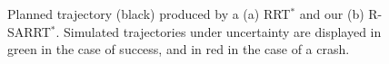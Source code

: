 \begin{figure} [h]
    \centering
    \caption{Planned trajectory (black) produced by a (a) RRT$^*$ and our (b) R-SARRT$^*$. 
    Simulated trajectories under uncertainty are displayed in green in the case of success, and in red in the case of a crash.}%
    \label{fig: simu window}%
\end{figure}

